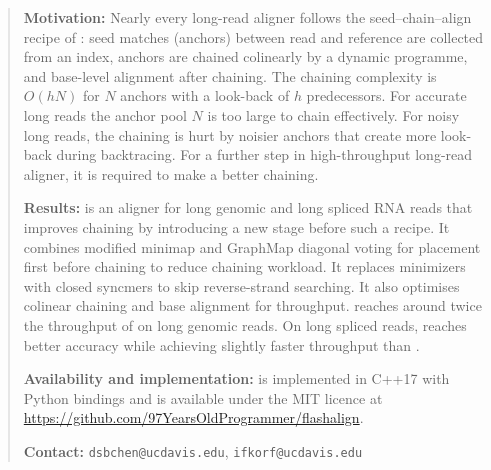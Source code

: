 \begin{abstract}
\noindent\textbf{Motivation:} Nearly every long-read aligner follows the seed--chain--align recipe of \mmtwo{}: seed matches (anchors) between read and reference are collected from an index, anchors are chained colinearly by a dynamic programme, and base-level alignment after chaining. The chaining complexity is $O(hN)$ for $N$ anchors with a look-back of $h$ predecessors. For accurate long reads the anchor pool $N$ is too large to chain effectively. For noisy long reads, the chaining is hurt by noisier anchors that create more look-back during backtracing. For a further step in high-throughput long-read aligner, it is required to make a better chaining.

\vspace{0.5\baselineskip}
\noindent\textbf{Results:} \flash{} is an aligner for long genomic and long spliced RNA reads that improves chaining by introducing a new stage before such a recipe. It combines modified minimap and GraphMap diagonal voting for placement first before chaining to reduce chaining workload. It replaces minimizers with closed syncmers to skip reverse-strand searching. It also optimises colinear chaining and base alignment for throughput. \flash{} reaches around twice the throughput of \mmtwo{} on long genomic reads. On long spliced reads, \flash{} reaches better accuracy while achieving slightly faster throughput than \mmtwo{}.

\vspace{0.5\baselineskip}
\noindent\textbf{Availability and implementation:} \flash{} is implemented in C++17 with Python bindings and is available under the MIT licence at \url{https://github.com/97YearsOldProgrammer/flashalign}.

\vspace{0.5\baselineskip}
\noindent\textbf{Contact:} \texttt{dsbchen@ucdavis.edu}, \texttt{ifkorf@ucdavis.edu}
\end{abstract}
